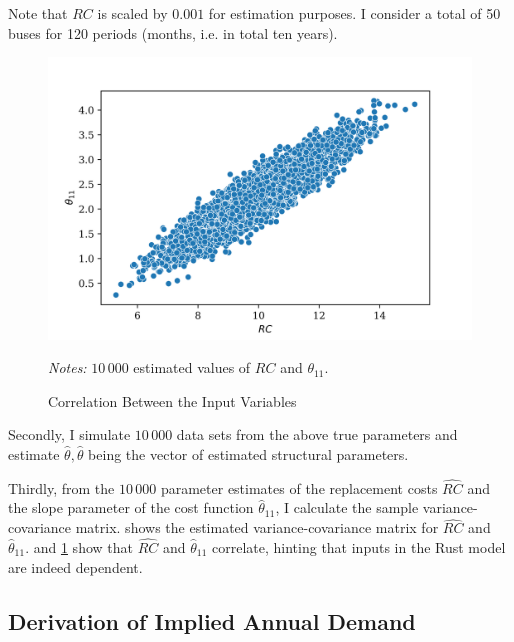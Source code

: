 \noindent Note that $RC$ is scaled by $0.001$ for estimation purposes. I consider a total of 50 buses for 120 periods (months, i.e. in total ten years).

\begin{figure}[t]
	\caption{Correlation Between the Input Variables}
    \label{correlation}
	\centering
	\vspace*{-4mm}
	\begin{centering}
	\includegraphics[scale=0.9]{../figures/correlation_rc_theta.png}
	\end{centering}

	\small
	\textit{Notes:} $10\,000$ estimated values of $RC$ and $\theta_{11}$.

\end{figure}


Secondly, I simulate $10\,000$ data sets from the above true parameters and estimate $\hat{\theta}, \hat{\theta}$ being the vector of estimated structural parameters.

Thirdly, from the $10\,000$ parameter estimates of the replacement costs $\widehat{RC}$ and the slope parameter of the cost function ${\hat{\theta}}_{11}$, I calculate the sample variance-covariance matrix.  shows the estimated variance-covariance matrix for $\widehat{RC}$ and ${\hat{\theta}}_{11}$.  and \cref{correlation} show that $\widehat{RC}$ and ${\hat{\theta}}_{11}$ correlate, hinting that inputs in the Rust model are indeed dependent.

\subsection{Derivation of Implied Annual Demand}


